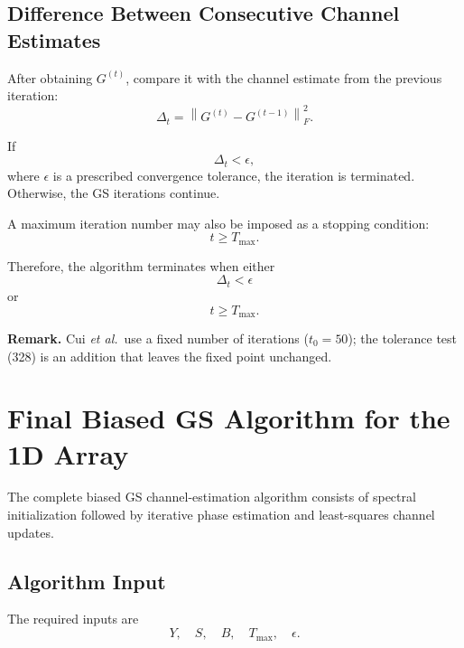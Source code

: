 \documentclass[12pt,a4paper]{article}
\begin{document}
\subsection{Difference Between Consecutive Channel Estimates}

After obtaining $G^{(t)}$, compare it with the channel estimate from
the previous iteration:
\begin{equation}
\boxed{
\Delta_t
=
\left\|
G^{(t)}-G^{(t-1)}
\right\|_F^2
}.
\tag{327}
\end{equation}

If
\begin{equation}
\boxed{
\Delta_t<\epsilon
},
\tag{328}
\end{equation}
where $\epsilon$ is a prescribed convergence tolerance, the iteration
is terminated. Otherwise, the GS iterations continue.

A maximum iteration number may also be imposed as a stopping
condition:
\begin{equation}
\boxed{
t\geq T_{\max}
}.
\tag{329}
\end{equation}

Therefore, the algorithm terminates when either
\begin{equation}
\Delta_t<\epsilon
\tag{330}
\end{equation}
or
\begin{equation}
t\geq T_{\max}.
\tag{331}
\end{equation}

\textbf{Remark.} Cui \emph{et al.}\ use a fixed number of iterations
($t_0=50$); the tolerance test (328) is an addition that leaves the
fixed point unchanged.

\section{Final Biased GS Algorithm for the 1D Array}

The complete biased GS channel-estimation algorithm consists of
spectral initialization followed by iterative phase estimation and
least-squares channel updates.

\subsection{Algorithm Input}

The required inputs are
\begin{equation}
\boxed{
Y,\quad S,\quad B,\quad T_{\max},\quad \epsilon
}.
\tag{332}
\end{equation}
\end{document}
